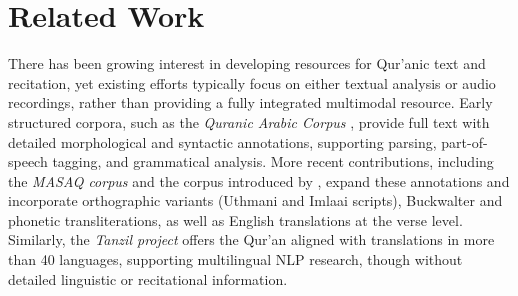 \section{Related Work}

There has been growing interest in developing resources for Qur’anic text and recitation, yet existing efforts typically focus on either textual analysis or audio recordings, rather than providing a fully integrated multimodal resource. Early structured corpora, such as the \emph{Quranic Arabic Corpus} \cite{dukhovny2009qac}, provide full text with detailed morphological and syntactic annotations, supporting parsing, part-of-speech tagging, and grammatical analysis. More recent contributions, including the \emph{MASAQ corpus} \cite{sawalha2024masaq} and the corpus introduced by \cite{nashir2025quranic}, expand these annotations and incorporate orthographic variants (Uthmani and Imlaai scripts), Buckwalter and phonetic transliterations, as well as English translations at the verse level. Similarly, the \emph{Tanzil project} \cite{tanzil2008} offers the Qur’an aligned with translations in more than 40 languages, supporting multilingual NLP research, though without detailed linguistic or recitational information.

\begin{table}[t]
\centering
\caption{Feature comparison across prominent Quranic datasets. The proposed \textsc{Qur’an-MD} is the first to holistically integrate all listed modalities across multiple reciters at both verse and word levels, filling a critical gap in the available resources.}
\label{tab:comparison_final}
\end{table}



